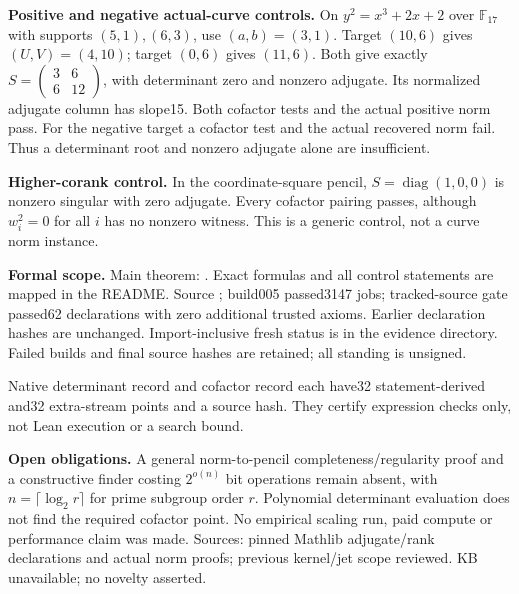 \documentclass[11pt]{article}
\begin{document}
\textbf{Positive and negative actual-curve controls.} On
$y^2=x^3+2x+2$ over $\mathbb F_{17}$ with supports $(5,1),(6,3)$, use
$(a,b)=(3,1)$. Target $(10,6)$ gives $(U,V)=(4,10)$; target $(0,6)$ gives
$(11,6)$. Both give exactly $S=\left(\begin{smallmatrix}3&6\\6&12\end{smallmatrix}\right)$,
with determinant zero and nonzero adjugate. Its normalized adjugate column
has slope15. Both cofactor tests and the actual positive norm pass.
For the negative target a cofactor test and the actual recovered norm fail.
Thus a determinant root and nonzero adjugate alone are insufficient.

\textbf{Higher-corank control.} In the coordinate-square pencil,
$S=\operatorname{diag}(1,0,0)$ is nonzero singular with zero adjugate.
Every cofactor pairing passes, although $w_i^2=0$ for all $i$ has no nonzero
witness. This is a generic control, not a curve norm instance.

\textbf{Formal scope.} Main theorem: .
Exact formulas and all control statements are mapped in the README.
Source ; build005 passed3147 jobs; tracked-source gate passed62
declarations with zero additional trusted axioms. Earlier declaration hashes
are unchanged. Import-inclusive fresh status is in the evidence directory.
Failed builds and final source hashes are retained; all standing is unsigned.

Native determinant record  and cofactor record
 each have32 statement-derived and32 extra-stream
points and a source hash. They certify expression checks only, not Lean execution
or a search bound.

\textbf{Open obligations.} A general norm-to-pencil completeness/regularity
proof and a constructive finder costing $2^{o(n)}$ bit operations remain absent,
with $n=\lceil\log_2 r\rceil$ for prime subgroup order $r$.
Polynomial determinant evaluation does not find the required cofactor point.
No empirical scaling run, paid compute or performance claim was made.
Sources: pinned Mathlib adjugate/rank declarations and actual norm proofs;
previous kernel/jet scope reviewed. KB unavailable; no novelty asserted.
\end{document}
